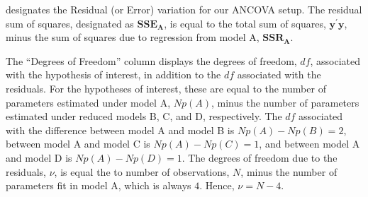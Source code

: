 \documentclass[11pt, oneside]{article}   	%
\begin{document}
designates the Residual (or Error) variation for our ANCOVA setup.  The residual sum of squares, designated as $ \mathbf{SSE_{A}}  $, is equal to the total sum of squares, $  \mathbf{y^{'}y}  $, minus the sum of squares due to regression from model A, $  \mathbf{SSR_{A}} $.  


  

\vspace{2 mm}

The ``Degrees of Freedom'' column displays the degrees of freedom,  $  df $, associated with the hypothesis of interest, in addition to the $ df  $ associated with the residuals.  For the hypotheses of interest, these are equal to the number of parameters estimated under model A, $  Np(A) $, minus the number of parameters estimated under reduced models B, C, and D, respectively.  The $ df $ associated with the difference between model A and model B is $  Np(A) - Np(B) = 2  $, between model A and model C is $  Np(A) - Np(C) = 1  $, and between model A and model D is $  Np(A) - Np(D) = 1  $.  The degrees of freedom due to the residuals,  $ \nu  $, is equal the to number of observations, $ N $, minus the number of parameters fit in model A, which is always $ 4  $.  Hence, $  \nu = N - 4 $.    


\vspace{2 mm}
\end{document}
